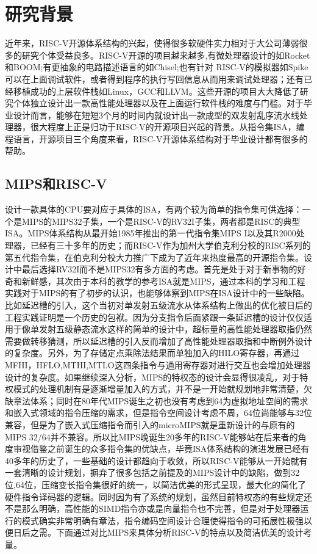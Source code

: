 \documentclass[11pt]{article}
\begin{document}
\section{研究背景}
近年来，RISC-V开源体系结构的兴起，使得很多软硬件实力相对于大公司薄弱很多的研究个体受益良多。RISC-V开源的项目越来越多,有微处理器设计的如Rocket和BOOM;有更抽象的电路描述语言的如Chisel;也有针对 RISC-V的模拟器如Spike可以在上面调试软件，或者得到程序的执行写回信息从而用来调试处理器；还有已经移植成功的上层软件栈如Linux，GCC和LLVM。这些开源的项目大大降低了研究个体独立设计出一款高性能处理器以及在上面运行软件栈的难度与门槛。对于毕业设计而言，能够在短短3个月的时间内就设计出一款成型的双发射乱序流水线处理器，很大程度上正是归功于RISC-V的开源项目兴起的背景。从指令集ISA，编程语言，开源项目三个角度来看，RISC-V开源体系结构对于毕业设计都有很多的帮助。
\subsection{MIPS和RISC-V}
设计一款具体的CPU要对应于具体的ISA，有两个较为简单的指令集可供选择：一个是MIPS的MIPS32子集，一个是RISC-V的RV32I子集，两者都是RISC的典型ISA。MIPS体系结构从最开始1985年推出的第一代指令集MIPS I以及其R2000处理器，已经有三十多年的历史；而RISC-V作为加州大学伯克利分校的RISC系列的第五代指令集，在伯克利分校大力推广下成为了近年来热度最高的开源指令集。设计中最后选择RV32I而不是MIPS32有多方面的考虑。首先是处于对于新事物的好奇和新鲜感，其次由于本科的教学的参考ISA就是MIPS，通过本科的学习和工程实践对于MIPS的有了初步的认识，也能够体察到MIPS在ISA设计中的一些缺陷。比如延迟槽的引入，这个当初对单发射五级流水从体系结构上做出的优化被日后的工程实践证明是一个历史的包袱。因为分支指令后面紧跟一条延迟槽的设计仅仅适用于像单发射五级静态流水这样的简单的设计中，超标量的高性能处理器取指仍然需要做转移猜测，所以延迟槽的引入反而增加了高性能处理器取指和中断例外设计的复杂度。另外，为了存储定点乘除法结果而单独加入的HILO寄存器，再通过MFHI，HFLO,MTHI,MTLO这四条指令与通用寄存器对进行交互也会增加处理器设计的复杂度。如果继续深入分析，MIPS的特权态的设计会显得很凌乱，对于特权模式的处理机制有是逐渐增量加入的方式，并不是一开始就规划地非常清楚，欠缺章法体系；同时在80年代MIPS诞生之初也没有考虑到64为虚拟地址空间的需求和嵌入式领域的指令压缩的需求，但是指令空间设计考虑不周，64位尚能够与32位兼容，但是为了嵌入式压缩指令而引入的microMIPS就是重新设计的与原有的MIPS 32/64并不兼容。所以比MIPS晚诞生20多年的RISC-V能够站在后来者的角度审视借鉴之前诞生的众多指令集的优缺点，毕竟ISA体系结构的演进发展已经有40多年的历史了，一些基础的设计都趋向于收敛，所以RISC-V能够从一开始就有一套清晰的设计规划，摒弃了很多包括之前提及的MIPS设计中的缺陷，做到32位,64位，压缩变长指令集很好的统一，以简洁优美的形式呈现，最大化的简化了硬件指令译码器的逻辑。同时因为有了系统的规划，虽然目前特权态的有些规定还不是那么明确，高性能的SIMD指令亦或是向量指令也不完善，但是对于处理器运行的模式确实非常明确有章法，指令编码空间设计合理使得指令的可拓展性极强以便日后之需。下面通过对比MIPS来具体分析RISC-V的特点以及简洁优美的设计考量。
\end{document}
